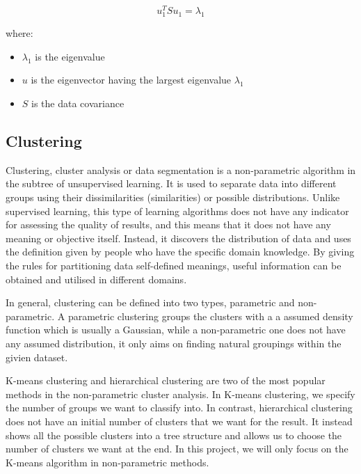 \documentclass[11pt]{article} %
\theoremstyle{plain}
\theoremstyle{definition}
\begin{document}
{
  \begin{equation}
    \label{eq:2.7}
    \tag{2.7}
    {u_{1}^{T}Su_{1} = \lambda_{1}}
  \end{equation}

  \footnotesize
  where:
  \begin{itemize}[label=-, leftmargin=4em, itemsep=0.1em]
    \item ${\lambda_{1}}$ is the eigenvalue
    \item ${u}$ is the eigenvector having the largest eigenvalue ${\lambda_{1}}$
    \item $S$ is the data covariance
  \end{itemize}
}

\subsection{Clustering}

Clustering, cluster analysis or data segmentation is a non-parametric algorithm in the subtree of unsupervised learning. It is used to separate data into different groups using their dissimilarities (similarities) or possible distributions. Unlike supervised learning, this type of learning algorithms does not have any indicator for assessing the quality of results, and this means that it does not have any meaning or objective itself. Instead, it discovers the distribution of data and uses the definition given by people who have the specific domain knowledge. By giving the rules for partitioning data self-defined meanings, useful information can be obtained and utilised in different domains\cite{hastie/etal:2009}.

In general, clustering can be defined into two types, parametric and non-parametric. A parametric clustering groups the clusters with a a assumed density function which is usually a Gaussian, while a non-parametric one does not have any assumed distribution, it only aims on finding natural groupings within the givien dataset.

K-means clustering and hierarchical clustering are two of the most popular methods in the non-parametric cluster analysis. In K-means clustering, we specify the number of groups we want to classify into. In contrast, hierarchical clustering does not have an initial number of clusters that we want for the result. It instead shows all the possible clusters into a tree structure and allows us to choose the number of clusters we want at the end. In this project, we will only focus on the K-means algorithm in non-parametric methods.
\end{document}
